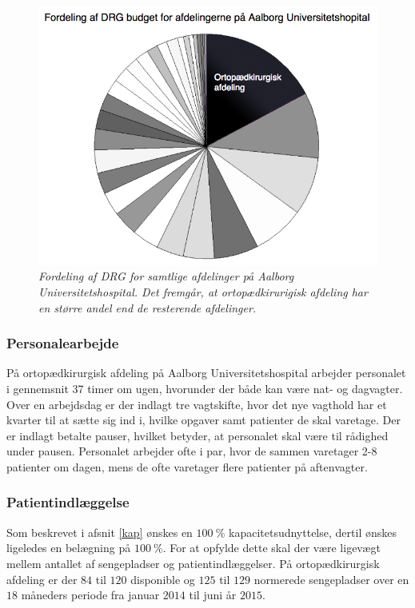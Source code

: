\begin{figure}[H]
	\flushleft 
	\centering
	\includegraphics[scale=0.45]{figures/Ortopaeddiagram.png}
	\flushleft
	\caption{\textit{Fordeling af DRG for samtlige afdelinger på Aalborg Universitetshospital. Det fremgår, at ortopædkirurigisk afdeling har en større andel end de resterende afdelinger.}\cite{Rasmussen2016}}
	\label{DRG_budget}
\end{figure}


\subsubsection{Personalearbejde} 
På ortopædkirurgisk afdeling på Aalborg Universitetshospital arbejder personalet i gennemsnit 37 timer om ugen\cite{Danske2015}, hvorunder der både kan være nat- og dagvagter. Over en arbejdsdag er der indlagt tre vagtskifte, hvor det nye vagthold har et kvarter til at sætte sig ind i, hvilke opgaver samt patienter de skal varetage. Der er indlagt betalte pauser, hvilket betyder, at personalet skal være til rådighed under pausen. Personalet arbejder ofte i par, hvor de sammen varetager 2-8 patienter om dagen, mens de ofte varetager flere patienter på aftenvagter. 


\subsubsection{Patientindlæggelse} 
Som beskrevet i afsnit \ref{kap} ønskes en $100~\%$ kapacitetsudnyttelse, dertil ønskes ligeledes en belægning på $100~\%$. 
For at opfylde dette skal der være ligevægt mellem antallet af sengepladser og patientindlæggelser. På ortopædkirurgisk afdeling er der $84$ til $120$ disponible og $125$ til $129$ normerede sengepladser over en $18$ måneders periode fra januar $2014$ til juni år $2015$. 

